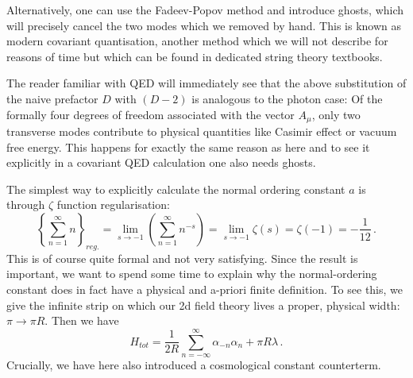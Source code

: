 \documentclass[12pt]{article}
\newcommand{\be}{\begin{equation}}
\newcommand{\ee}{\end{equation}}
\numberwithin{equation}{section}
\begin{document}
Alternatively, one can use the Fadeev-Popov method and introduce ghosts, which will precisely cancel the two modes which we removed by hand. This is known as modern covariant quantisation, another method which we will not describe for reasons of time but which can be found in dedicated string theory textbooks.

The reader familiar with QED will immediately see that the above substitution of the naive prefactor $D$ with $(D-2)$ is analogous to the photon case: Of the formally four degrees of freedom associated with the vector $A_\mu$, only two transverse modes contribute to physical quantities like Casimir effect or vacuum free energy. This happens for exactly the same reason as here and to see it explicitly in a covariant QED calculation one also needs ghosts.

The simplest way to explicitly calculate the normal ordering constant $a$ is through $\zeta$ function regularisation:
\be
\left\{\sum_{n=1}^\infty n \right\}_{reg.}=\lim_{s\to-1}\left(\sum_{n=1}^\infty
n^{-s}\right)=\lim_{s\to -1}\zeta(s)=\zeta(-1)=-\frac{1}{12}\,.
\ee
This is of course quite formal and not very satisfying. Since the result is important, we want to spend some time to explain why the normal-ordering constant does in fact have a physical and a-priori finite definition. To see this, we give the infinite strip on which our 2d field theory lives a proper, physical width: $\pi\to \pi R$. Then we have 
\be
H_{tot}=\frac{1}{2R}\sum_{n=-\infty}^\infty\alpha_{-n}\alpha_n+\pi R\lambda\,.
\ee
Crucially, we have here also introduced a cosmological constant counterterm.
\end{document}
